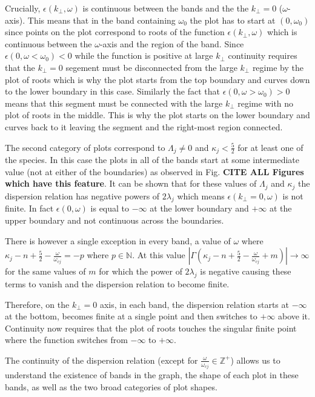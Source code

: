 \documentclass[12pt,a4paper]{article}
\begin{document}
    Crucially, $\epsilon(k_\perp, \omega)$ is continuous between the bands and the the $k_\perp = 0$ ($\omega$-axis).
    This means that in the band containing $\omega_0$ the plot has to start at $(0, \omega_0)$ since points on the plot correspond to roots of the function $\epsilon(k_\perp, \omega)$ which is continuous between the $\omega$-axis and the region of the band.
    Since $\epsilon(0, \omega < \omega_0) < 0$ while the function is positive at large $k_\perp$ continuity requires that the $k_\perp = 0$ segement must be disconnected from the large $k_\perp$ regime by the plot of roots which is why the plot starts from the top boundary and curves down to the lower boundary in this case.
    Similarly the fact that $\epsilon(0, \omega > \omega_0) > 0$ means that this segment must be connected with the large $k_\perp$ regime with no plot of roots in the middle.
    This is why the plot starts on the lower boundary and curves back to it leaving the segment and the right-most region connected.

    The second category of plots correspond to $\Lambda_j \neq 0$ and $\kappa_j < \frac{5}{2}$ for at least one of the species.
    In this case the plots in all of the bands start at some intermediate value (not at either of the boundaries) as observed in Fig. \textbf{CITE ALL Figures which have this feature}.
    It can be shown that for these values of $\Lambda_j$ and $\kappa_j$ the dispersion relation has negative powers of $2 \lambda_j$ which means $\epsilon(k_\perp = 0, \omega)$ is not finite.
    In fact $\epsilon(0, \omega)$ is equal to $-\infty$ at the lower boundary and $+\infty$ at the upper boundary and not continuous across the boundaries.

    There is however a single exception in every band, a value of $\omega$ where $\kappa_j - n + \frac{5}{2} - \frac{\omega}{\omega_{cj}} = -p$ where $p \in \mathbb{N}$.
    At this value $\left| \Gamma (\kappa_j - n + \frac{5}{2} - \frac{\omega}{\omega_{cj}} + m) \right| \rightarrow \infty$ for the same values of $m$ for which the power of $2 \lambda_j$ is negative causing these terms to vanish and the dispersion relation to become finite.

    Therefore, on the $k_\perp = 0$ axis, in each band, the dispersion relation starts at $-\infty$ at the bottom, becomes finite at a single point and then switches to $+\infty$ above it.
    Continuity now requires that the plot of roots touches the singular finite point where the function switches from $-\infty$ to $+\infty$.

    The continuity of the dispersion relation (except for $\frac{\omega}{\omega_{cj}} \in \mathbb{Z}^+$) allows us to understand the existence of bands in the graph, the shape of each plot in these bands, as well as the two broad categories of plot shapes.
\end{document}
